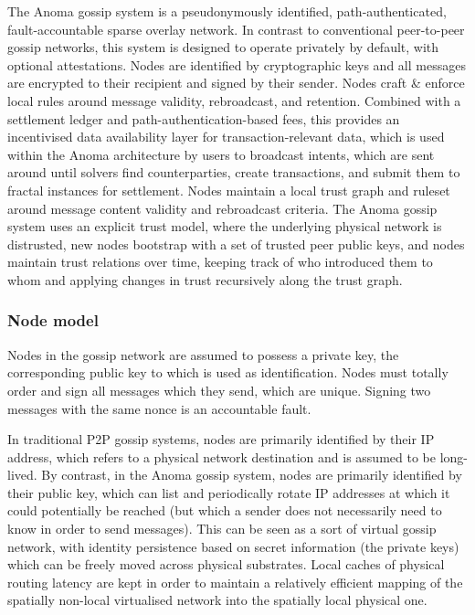 The Anoma gossip system is a pseudonymously identified,
path-authenticated, fault-accountable sparse overlay network. In
contrast to conventional peer-to-peer gossip networks, this system is
designed to operate privately by default, with optional attestations.
Nodes are identified by cryptographic keys and all messages are
encrypted to their recipient and signed by their sender. Nodes craft \&
enforce local rules around message validity, rebroadcast, and retention.
Combined with a settlement ledger and path-authentication-based fees,
this provides an incentivised data availability layer for
transaction-relevant data, which is used within the Anoma architecture
by users to broadcast intents, which are sent around until solvers find
counterparties, create transactions, and submit them to fractal
instances for settlement. Nodes maintain a local trust graph and ruleset
around message content validity and rebroadcast criteria. The Anoma
gossip system uses an explicit trust model, where the underlying
physical network is distrusted, new nodes bootstrap with a set of
trusted peer public keys, and nodes maintain trust relations over time,
keeping track of who introduced them to whom and applying changes in
trust recursively along the trust graph.

\subsubsection{Node model}\label{node-model}

Nodes in the gossip network are assumed to possess a private key, the
corresponding public key to which is used as identification. Nodes must
totally order and sign all messages which they send, which are unique.
Signing two messages with the same nonce is an accountable fault.

In traditional P2P gossip systems, nodes are primarily identified by
their IP address, which refers to a physical network destination and is
assumed to be long-lived. By contrast, in the Anoma gossip system, nodes
are primarily identified by their public key, which can list and
periodically rotate IP addresses at which it could potentially be
reached (but which a sender does not necessarily need to know in order
to send messages). This can be seen as a sort of virtual gossip network,
with identity persistence based on secret information (the private keys)
which can be freely moved across physical substrates. Local caches of
physical routing latency are kept in order to maintain a relatively
efficient mapping of the spatially non-local virtualised network into
the spatially local physical one.

